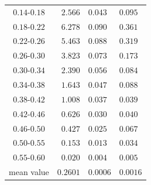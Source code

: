 \documentclass[12pt,a4paper,twoside]{article}
\begin{document}
\begin{table}[!htb]
\begin{center}
\begin{tabular}{|c||r@{ $\pm$ }l@{ $\pm$ }l|}
$ 0.14 $-$0.18  $&$  2.566 $&$  0.043 $&$  0.095 $\\
$ 0.18 $-$0.22  $&$  6.278 $&$  0.090 $&$  0.361 $\\
$ 0.22 $-$0.26  $&$  5.463 $&$  0.088 $&$  0.319 $\\
$ 0.26 $-$0.30  $&$  3.823 $&$  0.073 $&$  0.173 $\\
$ 0.30 $-$0.34  $&$  2.390 $&$  0.056 $&$  0.084 $\\
$ 0.34 $-$0.38  $&$  1.643 $&$  0.047 $&$  0.088 $\\
$ 0.38 $-$0.42  $&$  1.008 $&$  0.037 $&$  0.039 $\\
$ 0.42 $-$0.46  $&$  0.626 $&$  0.030 $&$  0.040 $\\
$ 0.46 $-$0.50  $&$  0.427 $&$  0.025 $&$  0.067 $\\
$ 0.50 $-$0.55  $&$  0.153 $&$  0.013 $&$  0.034 $\\
$ 0.55 $-$0.60  $&$  0.020 $&$  0.004 $&$  0.005 $\\
\hline\hline
mean value       &$  0.2601 $&$ 0.0006 $&$ 0.0016 $\\
\hline
\end{tabular}


\end{center}
\end{table}
\end{document}
